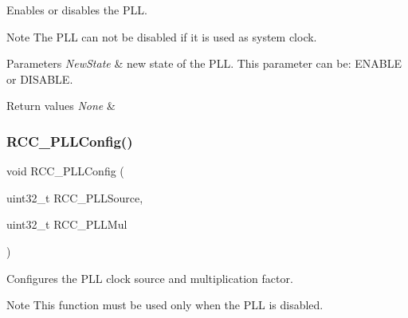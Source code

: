 Enables or disables the P\+LL. 

\begin{DoxyNote}{Note}
The P\+LL can not be disabled if it is used as system clock. 
\end{DoxyNote}

\begin{DoxyParams}{Parameters}
{\em New\+State} & new state of the P\+LL. This parameter can be\+: E\+N\+A\+B\+LE or D\+I\+S\+A\+B\+LE. \\
\hline
\end{DoxyParams}

\begin{DoxyRetVals}{Return values}
{\em None} & \\
\hline
\end{DoxyRetVals}
\mbox{\label{group___r_c_c___private___functions_ga0f67634cbe721f2c42f022d2a93229c8}} 
\subsubsection{\texorpdfstring{RCC\_PLLConfig()}{RCC\_PLLConfig()}}
{\footnotesize\ttfamily void R\+C\+C\+\_\+\+P\+L\+L\+Config (\begin{DoxyParamCaption}\item[{uint32\+\_\+t}]{R\+C\+C\+\_\+\+P\+L\+L\+Source,  }\item[{uint32\+\_\+t}]{R\+C\+C\+\_\+\+P\+L\+L\+Mul }\end{DoxyParamCaption})}



Configures the P\+LL clock source and multiplication factor. 

\begin{DoxyNote}{Note}
This function must be used only when the P\+LL is disabled. 
\end{DoxyNote}

